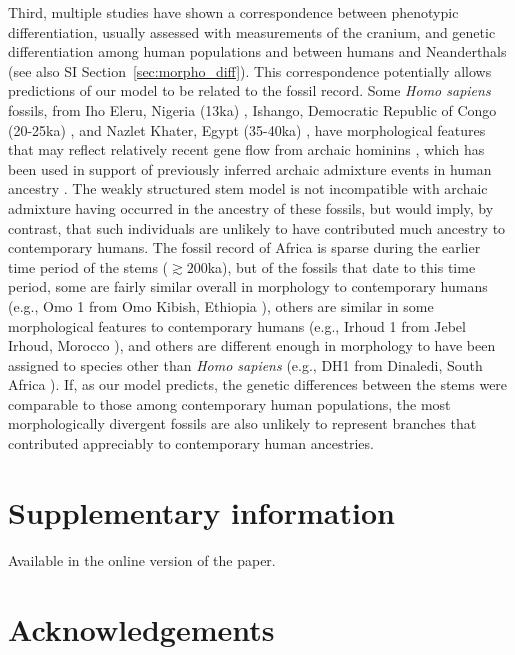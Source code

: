 \documentclass[]{article}
\begin{document}
Third, multiple studies have shown a correspondence between phenotypic
differentiation, usually assessed with measurements of the cranium, and genetic
differentiation among human populations and between humans and Neanderthals
\citep{Relethford1994-mh, Weaver2008-ho,Von_Cramon-Taubadel2009-zb} (see also
SI Section~\ref{sec:morpho_diff}).  This correspondence potentially allows
predictions of our model to be related to the fossil record. Some \emph{Homo
sapiens} fossils, from Iho Eleru, Nigeria (13ka) \citep{Harvati2011-xs},
Ishango, Democratic Republic of Congo (20-25ka) \citep{Crevecoeur2016-cl}, and
Nazlet Khater, Egypt (35-40ka) \citep{Crevecoeur2012-we}, have morphological
features that may reflect relatively recent gene flow from archaic hominins
\citep{Harvati2011-xs, Crevecoeur2016-cl}, which has been used in support of
previously inferred archaic admixture events in human ancestry
\cite{Scerri2018-nl, Durvasula2020-td, Bergstrom2021-iw}.  The weakly
structured stem model is not incompatible with archaic admixture having
occurred in the ancestry of these fossils, but would imply, by contrast, that
such individuals are unlikely to have contributed much ancestry to contemporary
humans. The fossil record of Africa is sparse during the earlier time period of
the stems ($\gtrsim200$ka), but of the fossils that date to this time period,
some are fairly similar overall in morphology to contemporary humans (e.g., Omo
1 from Omo Kibish, Ethiopia \citep{Day1969-rh,Vidal2022-qe}), others are
similar in some morphological features to contemporary humans (e.g., Irhoud 1
from Jebel Irhoud, Morocco \citep{Hublin2017-cq,Richter2017-zu}), and others
are different enough in morphology to have been assigned to species other than
\emph{Homo sapiens} (e.g., DH1 from Dinaledi, South Africa
\citep{Berger2015-bq,Dirks2017-uk}). If, as our model predicts, the genetic
differences between the stems were comparable to those among contemporary human
populations, the most morphologically divergent fossils are also unlikely to
represent branches that contributed appreciably to contemporary human
ancestries.




\section*{Supplementary information}
Available in the online version of the paper.

\section*{Acknowledgements}
\end{document}

